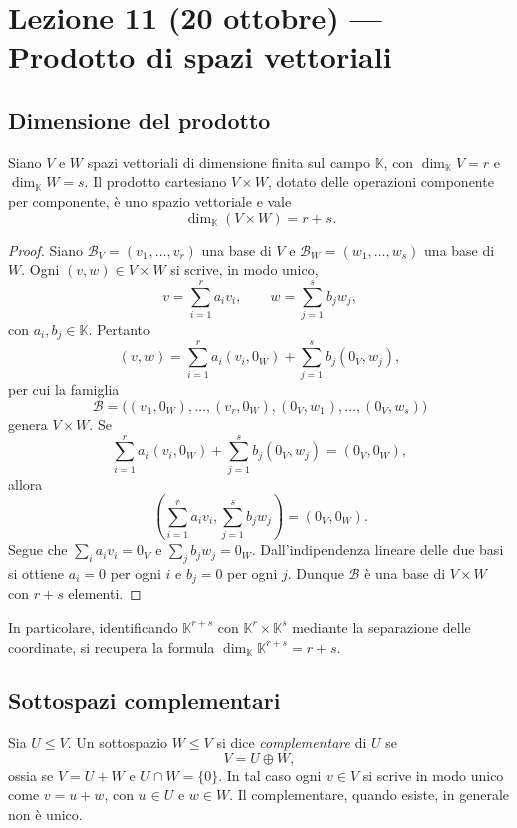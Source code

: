 \documentclass[11pt,a4paper]{article}
\newcommand{\KK}{\mathbb{K}}
\theoremstyle{plain}
\theoremstyle{definition}
\theoremstyle{remark}
\begin{document}
\section{Lezione 11 (20 ottobre) --- Prodotto di spazi vettoriali}

\subsection{Dimensione del prodotto}

Siano $V$ e $W$ spazi vettoriali di dimensione finita sul campo $\KK$, con
$\dim_{\KK}V=r$ e $\dim_{\KK}W=s$. Il prodotto cartesiano $V\times W$, dotato
 delle operazioni componente per componente, è uno spazio vettoriale e vale
\[
  \dim_{\KK}(V\times W)=r+s.
\]

\begin{proof}
Siano $\mathcal B_V=(v_1,\ldots,v_r)$ una base di $V$ e
$\mathcal B_W=(w_1,\ldots,w_s)$ una base di $W$. Ogni $(v,w)\in V\times W$
si scrive, in modo unico,
\[
 v=\sum_{i=1}^r a_i v_i,\qquad w=\sum_{j=1}^s b_jw_j,
\]
con $a_i,b_j\in\KK$. Pertanto
\[
 (v,w)=\sum_{i=1}^r a_i(v_i,0_W)+\sum_{j=1}^s b_j(0_V,w_j),
\]
per cui la famiglia
\[
 \mathcal B=\bigl((v_1,0_W),\ldots,(v_r,0_W),
 (0_V,w_1),\ldots,(0_V,w_s)\bigr)
\]
genera $V\times W$. Se
\[
 \sum_{i=1}^r a_i(v_i,0_W)+\sum_{j=1}^s b_j(0_V,w_j)=(0_V,0_W),
\]
allora
\[
 \left(\sum_{i=1}^r a_iv_i,\sum_{j=1}^s b_jw_j\right)=(0_V,0_W).
\]
Segue che $\sum_i a_iv_i=0_V$ e $\sum_j b_jw_j=0_W$. Dall'indipendenza
lineare delle due basi si ottiene $a_i=0$ per ogni $i$ e $b_j=0$ per ogni
$j$. Dunque $\mathcal B$ è una base di $V\times W$ con $r+s$ elementi.
\end{proof}

In particolare, identificando $\KK^{r+s}$ con $\KK^r\times\KK^s$ mediante
la separazione delle coordinate, si recupera la formula
$\dim_{\KK}\KK^{r+s}=r+s$.

\subsection{Sottospazi complementari}

Sia $U\leq V$. Un sottospazio $W\leq V$ si dice \emph{complementare} di $U$
se
\[
 V=U\oplus W,
\]
ossia se $V=U+W$ e $U\cap W=\{0\}$. In tal caso ogni $v\in V$ si scrive in
modo unico come $v=u+w$, con $u\in U$ e $w\in W$.
Il complementare, quando esiste, in generale non è unico.
\end{document}
